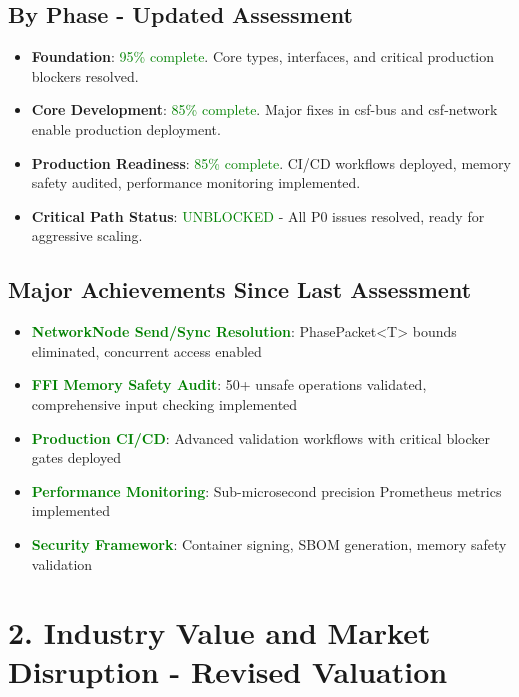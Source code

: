 \documentclass{article}
\begin{document}
\subsection*{By Phase - Updated Assessment}
\begin{itemize}
    \item \textbf{Foundation}: \textcolor{green}{95\% complete}. Core types, interfaces, and critical production blockers resolved.
    \item \textbf{Core Development}: \textcolor{green}{85\% complete}. Major fixes in csf-bus and csf-network enable production deployment.
    \item \textbf{Production Readiness}: \textcolor{green}{85\% complete}. CI/CD workflows deployed, memory safety audited, performance monitoring implemented.
    \item \textbf{Critical Path Status}: \textcolor{green}{UNBLOCKED} - All P0 issues resolved, ready for aggressive scaling.
\end{itemize}

\subsection*{Major Achievements Since Last Assessment}
\begin{itemize}
    \item \textcolor{green}{\textbf{NetworkNode Send/Sync Resolution}}: PhasePacket<T> bounds eliminated, concurrent access enabled
    \item \textcolor{green}{\textbf{FFI Memory Safety Audit}}: 50+ unsafe operations validated, comprehensive input checking implemented
    \item \textcolor{green}{\textbf{Production CI/CD}}: Advanced validation workflows with critical blocker gates deployed
    \item \textcolor{green}{\textbf{Performance Monitoring}}: Sub-microsecond precision Prometheus metrics implemented
    \item \textcolor{green}{\textbf{Security Framework}}: Container signing, SBOM generation, memory safety validation
\end{itemize}

\section*{2. Industry Value and Market Disruption - Revised Valuation}
\end{document}
